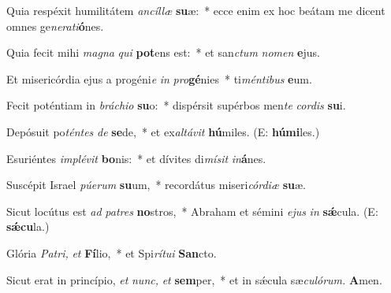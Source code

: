 \item Quia respéxit humilitátem \textit{ancíllæ} \textbf{su}æ:~* ecce enim ex hoc beátam me dicent omnes ge\textit{nerati}\textbf{ó}nes.
\item Quia fecit mihi \textit{magna} \textit{qui} \textbf{pot}ens est:~* et san\textit{ctum} \textit{nomen} \textbf{e}jus.
\item Et misericórdia ejus a progéni\textit{e} \textit{in} \textit{pro}\textbf{gé}nies~* ti\textit{méntibus} \textbf{e}um.
\item Fecit poténtiam in \textit{bráchio} \textbf{su}o:~* dispérsit supérbos men\textit{te} \textit{cordis} \textbf{su}i.
\item Depósuit po\textit{téntes} \textit{de} \textbf{se}de,~* et ex\hspace{0.03em}\textit{altávit}  \textbf{hú}miles. (E: \textbf{hú}\textbf{mi}les.)
\item Esuriéntes \textit{implévit} \textbf{bo}nis:~* et dívites di\textit{mísit} \textit{in}\textbf{á}nes.
\item Suscépit Israel \textit{púerum} \textbf{su}um,~* recordátus miseri\hspace{0.01em}\textit{córdiæ} \textbf{su}æ.
\item Sicut locútus est \textit{ad} \textit{patres} \textbf{no}stros,~* Abraham et sémini \textit{ejus} \textit{in} \textbf{sǽ}cula. (E: \textbf{sǽcu}la.)
\item Glória \textit{Patri,} \textit{et} \textbf{Fí}lio,~* et Spi\textit{rítui} \textbf{San}cto.
\item Sicut erat in princípio, \textit{et} \textit{nunc,} \textit{et} \textbf{sem}per,~* et in sǽcula sæ\hspace{0.01em}\textit{culórum.} \textbf{A}men.